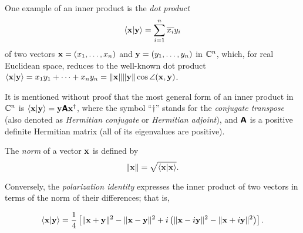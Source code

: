 {
\color{blue}
\bexample
One example of an inner product is  the
{\em dot product}
\begin{equation}
\langle {{\bf x}} \vert  {\bf y} \rangle
=
\sum_{i=1}^n \overline{x_i}y_i
\end{equation}
of two vectors ${\bf x}=
(x_1,\ldots , x_n)$
and
${\bf y}=
(y_1,\ldots , y_n)$ in ${\Bbb C}^n$,
which, for real Euclidean space,  reduces to the well-known dot product
$\langle  {\bf x} \vert {\bf y} \rangle
=
{x_1}y_1 + \cdots + {x_n}y_n  = \| {\bf x}\| \| {\bf y}\| \cos \angle ({\bf x},{\bf y})$.


It is mentioned without proof that the most general form of an inner product in ${\Bbb C}^n$
is
$\langle  {\bf x} \vert {\bf y} \rangle
=  {\bf y} \textsf{\textbf{A}} {\bf x}^\dagger$,
where the symbol ``$\dagger$'' stands for the {\em conjugate transpose} (also denoted as
{\em Hermitian conjugate} or {\em Hermitian adjoint}),
and $ \textsf{\textbf{A}} $ is a positive definite Hermitian matrix (all of its eigenvalues are positive).
\eexample
}



The {\em norm} of a vector ${\bf x}$
is defined by
\begin{equation}
\|
{\bf x}
\|
=\sqrt{\langle {\bf x}\vert {\bf x}\rangle }
.
\label{2018-mm-ch-vn}
\end{equation}

Conversely, the {\em polarization identity}
expresses the inner product of two vectors in terms of the norm of their differences; that is,

\begin{equation}
\langle {\bf x}\vert {\bf y}\rangle
=
\frac{1}{4}\left[
\|  {\bf x}+ {\bf y} \|^2
-
\|  {\bf x}- {\bf y} \|^2
+ i
\left(
 \|  {\bf x}- i{\bf y} \|^2
-
\|  {\bf x}+ i{\bf y} \|^2
\right)
\right]
.
\label{2015-m-ch-polidc}
\end{equation}


